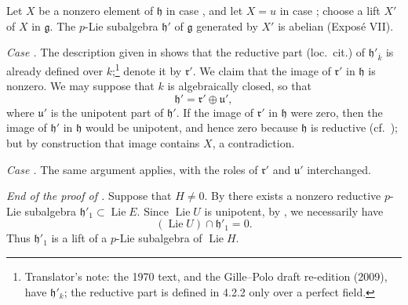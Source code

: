 Let \(X\) be a nonzero element of \(\mathfrak h\) in case , and
let \(X=u\) in case ; choose a lift \(X'\) of \(X\) in
\(\mathfrak g\).  The \(p\)-Lie subalgebra \(\mathfrak h'\) of
\(\mathfrak g\) generated by \(X'\) is abelian (Exposé VII).

\smallskip
\noindent
\emph{Case .}
The description given in  shows that the reductive part
(loc.\ cit.) of \(\mathfrak h'_{\overline{k}}\) is already defined
over \(k\);\footnote{Translator's note: the 1970 text, and the Gille--Polo draft re-edition (2009), have
\(\mathfrak h'_k\); the reductive part is defined in 4.2.2 only over a perfect field.}
denote it by \(\mathfrak r'\).  We claim that the image
of \(\mathfrak r'\) in \(\mathfrak h\) is nonzero.  We may suppose
that \(k\) is algebraically closed, so that
\[
  \mathfrak h'=\mathfrak r'\oplus\mathfrak u',
\]
where \(\mathfrak u'\) is the unipotent part of
\(\mathfrak h'\).  If the image of \(\mathfrak r'\) in
\(\mathfrak h\) were zero, then the image of \(\mathfrak h'\) in
\(\mathfrak h\) would be unipotent, and hence zero because
\(\mathfrak h\) is reductive (cf.\ ); but by construction that
image contains \(X\), a contradiction.

\smallskip
\noindent
\emph{Case .}
The same argument applies, with the roles of \(\mathfrak r'\) and
\(\mathfrak u'\) interchanged.

\smallskip
\noindent
\emph{End of the proof of .}
Suppose that \(H\ne0\).  By  there exists a nonzero reductive
\(p\)-Lie subalgebra
\(\mathfrak h'_1\subset\operatorname{Lie}E\).  Since
\(\operatorname{Lie}U\) is unipotent, by , we necessarily
have
\[
  (\operatorname{Lie}U)\cap\mathfrak h'_1=0.
\]
Thus \(\mathfrak h'_1\) is a lift of a \(p\)-Lie subalgebra of
\(\operatorname{Lie}H\).


